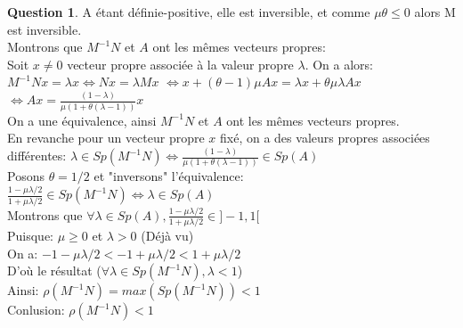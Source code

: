 \documentclass[a4paper]{article}
\theoremstyle{definition}
\newtheorem{que}{Question}
\begin{document}
	\begin{que}
		A étant définie-positive, elle est inversible, et comme $\mu \theta \leq 0$ alors M est inversible. \\
		Montrons que $M^{-1}N$ et $A$ ont les mêmes vecteurs propres: \\
		Soit $x \neq 0$ vecteur propre associée à la valeur propre $\lambda$.
		On a alors: \\
		$M^{-1}Nx=\lambda x \Leftrightarrow Nx=\lambda Mx$
		$\Leftrightarrow x +(\theta - 1) \mu A x = \lambda x + \theta \mu \lambda Ax$
		$\Leftrightarrow  Ax = \frac{(1 - \lambda)}{\mu(1+\theta(\lambda - 1))} x$ \\
		On a une équivalence, ainsi $M^{-1}N$ et $A$ ont les mêmes vecteurs propres.\\
		En revanche pour un vecteur propre $x$ fixé, on a des valeurs propres associées différentes: $\lambda \in Sp(M^{-1}N) \Leftrightarrow \frac{(1 - \lambda)}{\mu(1+\theta(\lambda - 1))} \in Sp(A)$ \\

		Posons $\theta = 1/2$ et "inversons" l'équivalence: \\
		$\frac{1 - \mu \lambda / 2}{1 + \mu \lambda / 2} \in Sp(M^{-1}N) \Leftrightarrow \lambda \in Sp(A)$ \\

		Montrons que $\forall \lambda \in Sp(A), \frac{1 - \mu \lambda / 2}{1 + \mu \lambda / 2} \in ]-1, 1[$ \\
		Puisque: $\mu \ge 0$ et $\lambda > 0$ (Déjà vu) \\
		On a: $ -1 -\mu \lambda/2 < -1 + \mu \lambda / 2 < 1 +\mu \lambda / 2$ \\
		D'où le résultat ($\forall \lambda \in Sp(M^{-1}N), \lambda < 1$) \\

		Ainsi: $\rho(M^{-1}N) = max(Sp(M^{-1}N)) < 1$ \\
		Conlusion: $\rho(M^{-1}N) < 1$
	\end{que}
\end{document}
